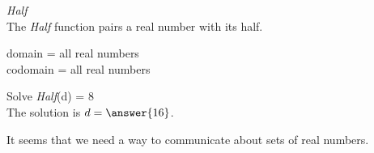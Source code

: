 \documentclass{ximera}
\begin{document}
\begin{question} \textit{Half} \\
The \textit{Half} function pairs a real number with its half.

domain = all real numbers  \\ 
codomain = all real numbers


Solve \textit{Half}(d) = $8$ \\

The solution is $d = \answer{16}$.

\end{question} 


It seems that we need a way to communicate about sets of real numbers.
\end{document}
